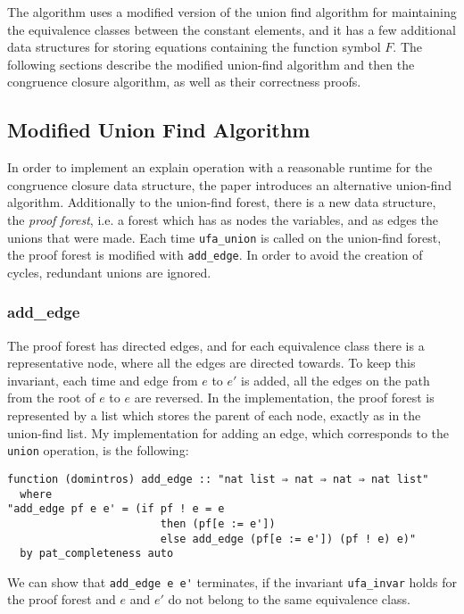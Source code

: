 The algorithm uses a modified version of the union find algorithm for maintaining the equivalence classes between the constant elements, and it has a few additional data structures for storing equations containing the function symbol $F$. The following sections describe the modified union-find algorithm and then the congruence closure algorithm, as well as their correctness proofs.

\subsection{Modified Union Find Algorithm}

In order to implement an explain operation with a reasonable runtime for the congruence closure data structure, the paper \cite{Nieuwenhuis} introduces an alternative union-find algorithm. Additionally to the union-find forest, there is a new data structure, the \emph{proof forest}, i.e. a forest which has as nodes the variables, and as edges the unions that were made. Each time \lstinline{ufa_union} is called on the union-find forest, the proof forest is modified with \lstinline{add_edge}. In order to avoid the creation of cycles, redundant unions are ignored.

\subsubsection{add\_edge}
\label{subsubsection:addedge}

The proof forest has directed edges, and for each equivalence class there is a representative node, where all the edges are directed towards. To keep this invariant, each time and edge from $e$ to $e'$ is added, all the edges on the path from the root of $e$ to $e$ are reversed.
In the implementation, the proof forest is represented by a list which stores the parent of each node, exactly as in the union-find list. My implementation for adding an edge, which corresponds to the \lstinline{union} operation, is the following:

\begin{lstlisting}
function (domintros) add_edge :: "nat list ⇒ nat ⇒ nat ⇒ nat list"
  where
"add_edge pf e e' = (if pf ! e = e
                        then (pf[e := e'])
                        else add_edge (pf[e := e']) (pf ! e) e)"
  by pat_completeness auto
\end{lstlisting}

We can show that \lstinline{add_edge e e'} terminates, if the invariant \lstinline{ufa_invar} holds for the proof forest and $e$ and $e'$ do not belong to the same equivalence class.

